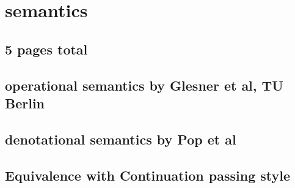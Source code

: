 \chapter{semantics}


\section{5 pages total}
\section{operational semantics by Glesner et al, TU Berlin}
\section{denotational semantics by Pop et al}
\section{Equivalence with Continuation passing style}




